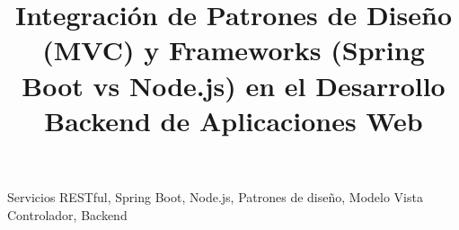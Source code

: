 \documentclass[conference]{IEEEtran}
\begin{document}
\title{Integración de Patrones de Diseño (MVC) y Frameworks (Spring Boot vs Node.js) en el Desarrollo Backend de Aplicaciones Web}

\author{
}

\maketitle

\begin{abstract}

\end{abstract}

\begin{IEEEkeywords}
Servicios RESTful, Spring Boot, Node.js, Patrones de diseño, Modelo Vista Controlador, Backend
\end{IEEEkeywords}










\printbibliography
\end{document}
